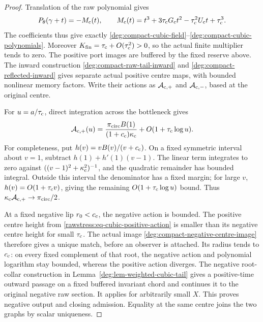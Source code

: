 \begin{proof}
Translation of the raw polynomial gives
\[
 P_\theta(\gamma+t)=-M_{\rm c}(t),\qquad
 M_{\rm c}(t)=t^3+3\tau_{\rm c}G_{\rm c}t^2
                  -\tau_{\rm c}^2U_{\rm c}t+\tau_{\rm c}^3.
\]
The coefficients thus give exactly
\eqref{deg:compact-cubic-field}--\eqref{deg:compact-cubic-polynomials}.
Moreover
\(K_{\rm fin}=\tau_{\rm c}+O(\tau_{\rm c}^2)>0\), so the actual
finite multiplier tends to zero. The positive port images are buffered
by the fixed reserve above. The inward construction
\eqref{deg:compact-raw-tail-inward} and
\eqref{deg:compact-reflected-inward} gives separate actual positive
centre maps, with bounded nonlinear memory factors. Write their actions
as \(\mathcal A_{{\rm c},+}\) and \(\mathcal A_{{\rm c},-}\), based at
the original centre.

For \(u=a/\tau_{\rm c}\), direct integration across the bottleneck gives
\begin{equation}\label{rawstress:eq-cubic-positive-action}
 \mathcal A_{{\rm c},+}(u)
 =\frac{\pi_{\rm circ}B(1)}
             {(1+c_{\rm c})\kappa_{\rm c}}
                       +O(1+\tau_{\rm c}\log u).
\end{equation}
For completeness, put \(h(v)=vB(v)/(v+c_{\rm c})\). On a fixed
symmetric interval about \(v=1\), subtract \(h(1)+h'(1)(v-1)\).
The linear term integrates to zero against
\(((v-1)^2+\kappa_{\rm c}^2)^{-1}\), and the quadratic remainder
has bounded integral. Outside this interval the denominator has a
fixed margin; for large \(v\), \(h(v)=O(1+\tau_{\rm c}v)\), giving
the remaining \(O(1+\tau_{\rm c}\log u)\) bound. Thus
\(\kappa_{\rm c}\mathcal A_{{\rm c},+}\to\pi_{\rm circ}/2\).

At a fixed negative lip \(r_0<c_{\rm c}\), the negative action is
bounded. The positive centre height from
\eqref{rawstress:eq-cubic-positive-action} is smaller than its negative
centre height for small \(\tau_{\rm c}\). The actual image
\eqref{deg:compact-negative-centre-image} therefore gives a unique match,
before an observer is attached. Its radius tends to \(c_{\rm c}\):
on every fixed complement of that root, the negative action and
polynomial logarithm stay bounded, whereas the positive action diverges.
The negative root-collar construction in
Lemma~\ref{deg:lem-weighted-cubic-tail} gives a positive-time outward
passage on a fixed buffered invariant chord and continues it to the
original negative raw section. It applies for arbitrarily small \(X\).
This proves negative output and closing admission. Equality at the
same centre joins the two graphs by scalar uniqueness.


\end{proof}
